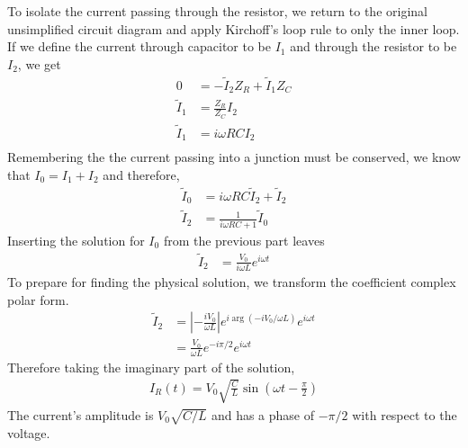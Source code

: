 To isolate the current passing through the resistor, we return to the 
original unsimplified circuit diagram and apply Kirchoff's loop rule to only 
the inner loop. If we define the current through capacitor to be $I_1$ and
through the resistor to be $I_2$, we get
\begin{align*}
	0 &= -\tilde I_2 Z_R + \tilde I_1 Z_C \\
	\tilde I_1 &= \frac{Z_R}{Z_C} I_2 \\
	\tilde I_1 &= i{\omega}RC I_2 \\	
\end{align*}
Remembering the the current passing into a junction must be conserved, we know
that $I_0 = I_1 + I_2$ and therefore,
\begin{align*}
	\tilde I_0 &= i{\omega}RC \tilde I_2 + \tilde I_2 \\
	\tilde I_2 &= \frac{1}{i{\omega}RC + 1} \tilde I_0
\end{align*}
Inserting the solution for $I_0$ from the previous part leaves
\begin{align*}
	\tilde I_2 &= \frac{V_0}{i{\omega} L} e^{i{\omega} t}
\end{align*}
To prepare for finding the physical solution, we transform the coefficient
complex polar form.
\begin{align*}
	\tilde I_2 &= \left|-\frac{iV_0}{{\omega} L}\right| e^{i\arg(-iV_0/{\omega} L)} e^{i{\omega} t} \\
		&= \frac{V_0}{{\omega} L} e^{-i{\pi}/2} e^{i{\omega} t}
\end{align*}
Therefore taking the imaginary part of the solution,
\begin{align}
	\boxed{
	I_R(t) = V_0 \sqrt{\frac{C}{L}} \sin({\omega} t - \frac {\pi}2)
	}
\end{align}
The current's amplitude is $V_0\sqrt{C/L}$ and has a phase of $-{\pi}/2$ with
respect to the voltage.
